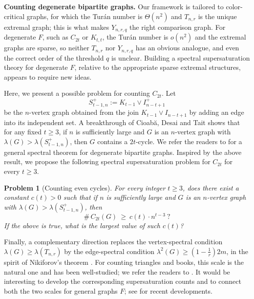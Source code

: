\documentclass[11pt,a4paper]{article}
\newtheorem{problem}[theorem]{Problem}
\theoremstyle{definition}
\theoremstyle{plain}
\renewcommand{\ge}{\geqslant}
\begin{document}
\medskip
\noindent\textbf{Counting degenerate bipartite graphs.}
Our framework is tailored to color-critical graphs, for
which the Tur\'an number is $\Theta(n^2)$ and $T_{n,r}$ is
the unique extremal graph; this is what makes $Y_{n,r,q}$
the right comparison graph. For degenerate $F$, such as $C_{2t}$ or $K_{t,t}$, the Tur\'an number is $o(n^2)$ and the extremal
graphs are sparse, so neither $T_{n,r}$ nor $Y_{n,r,q}$
has an obvious analogue, and even the correct order of the
threshold $q$ is unclear. Building a spectral
supersaturation theory for degenerate $F$, relative to the
appropriate sparse extremal structures, appears to require new ideas.


Here, we present a possible problem for counting $C_{2t}$. Let $$S_{t-1,n}^+:=K_{t-1}\vee I_{n-t+1}^+$$
be the $n$-vertex graph obtained from the join $K_{t-1}\vee I_{n-t+1}$ by adding an edge into its independent set. A breakthrough of 
Cioab\u{a}, Desai and Tait \cite{CDT2024} shows  that for any fixed $t\ge 3$, if $n$ is sufficiently large and  $G$ is an $n$-vertex graph with $\lambda (G) > \lambda (S_{t-1,n}^+)$, then $G$ contains a $2t$-cycle. 
We refer the readers to \cite{BDT2025} for a general spectral theorem for degenerate bipartite graphs. 
Inspired by the above result, we propose the following spectral supersaturation problem for $C_{2t}$ for every $t\ge 3$. 

\begin{problem}[Counting even cycles]
For every integer $t\ge 3$, does there exist a constant $c(t) >0$ such that if $n$ is sufficiently large and 
$G$ is an $n$-vertex graph with $\lambda (G) > \lambda (S_{t-1,n}^+)$, then 
$$ \texttt{\#}\, C_{2t} (G) \ \ge \ c(t)\cdot n^{t-3}\ ? $$
 If the above is true, 
 what is the largest value of such $c(t)$?  
\end{problem}



\smallskip 
Finally, a complementary direction replaces the vertex-spectral 
condition $\lambda(G)\ge\lambda(T_{n,r})$ by the
edge-spectral condition $\lambda^2(G)\ge {(1-\frac{1}{r})2m}$, in the spirit
of Nikiforov's theorem \cite{Nikiforov}. 
For counting triangles and books, this scale
is the natural one and has been well-studied; we refer the readers to \cite{NZ2021, ZLL2026, ZZ2026, ZYZZ2026}.  
It would be interesting to develop the corresponding supersaturation counts and 
to connect both the two scales for general graphs $F$; see  
 \cite{LLZ-edge-spectral, LLZ-edge-color-critical, LLZ2026-Spec-Sido, LLS2026-odd-cycles} for recent developments. 
\end{document}
